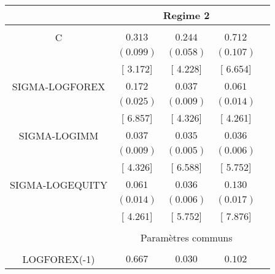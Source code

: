 \begin{tabular}{lrrrr}
\multicolumn{1}{c}{}&\multicolumn{3}{c}{Regime 2}&\multicolumn{1}{c}{}\\
[2.5pt] \hline \\ [-2.5pt]
\multicolumn{1}{c}{C}&\multicolumn{1}{c}{$0.313$}&\multicolumn{1}{c}{$0.244$}&\multicolumn{1}{c}{$0.712$}&\multicolumn{1}{c}{}\\
\multicolumn{1}{c}{}&\multicolumn{1}{c}{$(0.099)$}&\multicolumn{1}{c}{$(0.058)$}&\multicolumn{1}{c}{$(0.107)$}&\multicolumn{1}{c}{}\\
\multicolumn{1}{c}{}&\multicolumn{1}{c}{[ 3.172]}&\multicolumn{1}{c}{[ 4.228]}&\multicolumn{1}{c}{[ 6.654]}&\multicolumn{1}{c}{}\\
\multicolumn{1}{c}{SIGMA-LOGFOREX}&\multicolumn{1}{c}{$0.172$}&\multicolumn{1}{c}{$0.037$}&\multicolumn{1}{c}{$0.061$}&\multicolumn{1}{c}{}\\
\multicolumn{1}{c}{}&\multicolumn{1}{c}{$(0.025)$}&\multicolumn{1}{c}{$(0.009)$}&\multicolumn{1}{c}{$(0.014)$}&\multicolumn{1}{c}{}\\
\multicolumn{1}{c}{}&\multicolumn{1}{c}{[ 6.857]}&\multicolumn{1}{c}{[ 4.326]}&\multicolumn{1}{c}{[ 4.261]}&\multicolumn{1}{c}{}\\
\multicolumn{1}{c}{SIGMA-LOGIMM}&\multicolumn{1}{c}{$0.037$}&\multicolumn{1}{c}{$0.035$}&\multicolumn{1}{c}{$0.036$}&\multicolumn{1}{c}{}\\
\multicolumn{1}{c}{}&\multicolumn{1}{c}{$(0.009)$}&\multicolumn{1}{c}{$(0.005)$}&\multicolumn{1}{c}{$(0.006)$}&\multicolumn{1}{c}{}\\
\multicolumn{1}{c}{}&\multicolumn{1}{c}{[ 4.326]}&\multicolumn{1}{c}{[ 6.588]}&\multicolumn{1}{c}{[ 5.752]}&\multicolumn{1}{c}{}\\
\multicolumn{1}{c}{SIGMA-LOGEQUITY}&\multicolumn{1}{c}{$0.061$}&\multicolumn{1}{c}{$0.036$}&\multicolumn{1}{c}{$0.130$}&\multicolumn{1}{c}{}\\
\multicolumn{1}{c}{}&\multicolumn{1}{c}{$(0.014)$}&\multicolumn{1}{c}{$(0.006)$}&\multicolumn{1}{c}{$(0.017)$}&\multicolumn{1}{c}{}\\
\multicolumn{1}{c}{}&\multicolumn{1}{c}{[ 4.261]}&\multicolumn{1}{c}{[ 5.752]}&\multicolumn{1}{c}{[ 7.876]}&\multicolumn{1}{c}{}\\
[2.5pt] \hline \\ [-2.5pt]
\multicolumn{1}{c}{}&\multicolumn{3}{c}{Paramètres communs}&\multicolumn{1}{c}{}\\
[2.5pt] \hline \\ [-2.5pt]
\multicolumn{1}{c}{LOGFOREX(-1)}&\multicolumn{1}{c}{$0.667$}&\multicolumn{1}{c}{$0.030$}&\multicolumn{1}{c}{$0.102$}&\multicolumn{1}{c}{}\\

\end{tabular}
